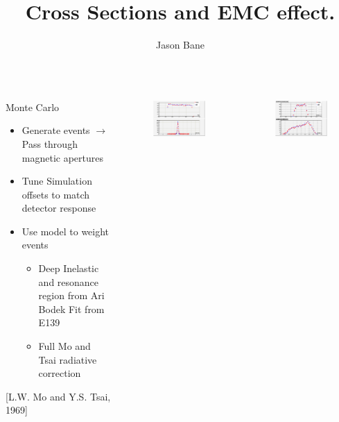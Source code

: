 \documentclass[12pt,usenames,dvipsnames]{beamer}
\title[]{Cross Sections and EMC effect.} %
\author{Jason Bane} %
\institute[UTK] %
{
University of Tennessee \\ %
\medskip
\textit{jbane1@vols.utk.edu} %
}
\date{} %
\begin{document}
\begin{frame}
\titlepage %
\end{frame}

\begin{frame}{}
	\begin{columns}
		\begin{block}{Monte Carlo}
			\begin{itemize}
				\item Generate events $\rightarrow$ Pass through magnetic apertures
				\item Tune Simulation offsets to match detector response
				\item Use model to weight events
				\begin{itemize}
					\item Deep Inelastic and resonance region from Ari Bodek Fit from E139 
					\item Full Mo and Tsai radiative correction
				\end{itemize}
			\end{itemize}
			\cite{bodek}  
			[L.W. Mo and Y.S. Tsai, 1969] 
		\end{block}
		\vspace{-20pt}
		\begin{figure}
			\includegraphics[width=6cm]{../images/dp_ytar_1207.png}
		\end{figure}
		\vspace{-30pt}
		\begin{figure}
			\includegraphics[width=6cm]{../images/xp_yp_foc_1207.png}
		\end{figure}
	\end{columns}
\end{frame}
\end{document}
